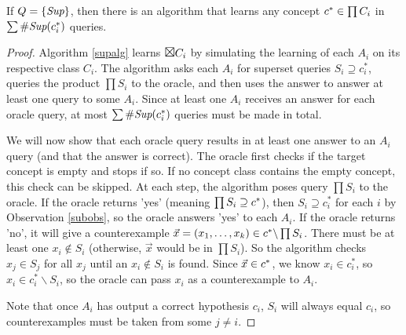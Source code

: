 \begin{proposition}

If $Q = \{ \supQ \}$, then there is an algorithm that learns any concept $\targ \in \prod C_i $ in $\sum \supCi{i}(c^*_i)$ queries.  
\end{proposition}
\begin{proof}
Algorithm \ref{supalg} learns $\Boxtimes C_i $ by simulating the learning of each $A_i$ on its respective class $C_i$. 
The algorithm asks each $A_i$ for superset queries $S_i \supseteq c_i^*$, queries the product $\prod S_i$ to the oracle, and then uses the answer to answer at least one query to some $A_i$. 
Since at least one $A_i$ receives an answer for each oracle query, at most $\sum \supCi{i}(c^*_i)$ queries must be made in total. 

 

We will now show that each oracle query results in at least one answer to an $A_i$ query (and that the answer is correct). 
The oracle first checks if the target concept is empty and stops if so.
If no concept class contains the empty concept, this check can be skipped. 
At each step, the algorithm poses query $\prod S_i$ to the oracle. 
If the oracle returns 'yes' (meaning $\prod S_i \supseteq \targ$), then  $S_i \supseteq c_i^*$ for each $i$ by Observation \ref{subobs}, so the oracle answers 'yes' to each $A_i$. 
If the oracle returns 'no', it will give a counterexample $\vec{x} = (x_1,\dots,x_k) \in \targ \backslash \prod S_i$. 
There must be at least one $x_i \not\in S_i$ (otherwise, $\vec{x}$ would be in $\prod S_i$). 
So the algorithm checks $x_j \in S_j$ for all $x_j$ until an $x_i \not\in S_i$ is found. 
Since $\vec{x} \in \targ$, we know $x_i \in c_i^*$, so $x_i \in c_i^* \backslash S_i$, so the oracle can pass $x_i$ as a counterexample to $A_i$. 

Note that once $A_i$ has output a correct hypothesis $c_i$, $S_i$ will always equal $c_i$, so counterexamples must be taken from some $j \ne i$. 
\end{proof}





